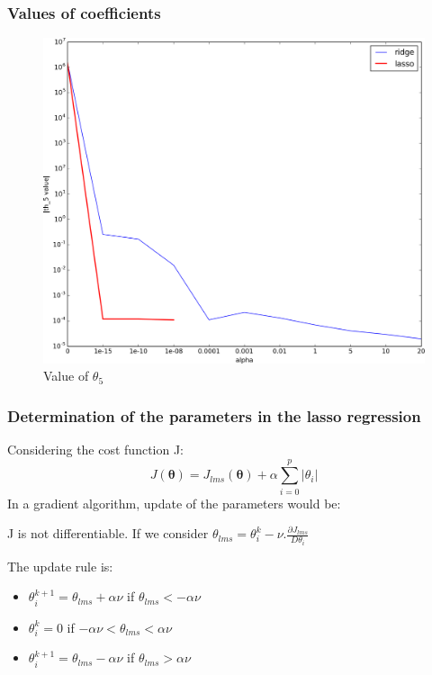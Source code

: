\documentclass[handout]{beamer}
\begin{document}
\begin{frame}
\frametitle{Values of coefficients}
\vspace{-2em}
\begin{table}
\resizebox{\textwidth}{!}{%
}
\end{table}
\begin{figure}
\includegraphics[height=0.4\textheight]{./fig/L1/coefs_th5_lasso.png}\\
Value of $\theta_5$
\end{figure}
\end{frame}

\begin{frame}
\frametitle{Determination of the parameters in the lasso regression}
Considering the cost function J:
$$
J(\bm{\theta}) =J_{lms}(\bm{\theta}) + \alpha \sum_{i=0}^p |\theta_i|
$$
In a gradient algorithm, update of the parameters would be:

J is not differentiable.
If we consider $\theta_{lms} = \theta_i^k -\nu.\frac{\partial J_{lms}}{D\theta_i} $

The update rule is:
\begin{itemize}
\item $\theta_i^{k+1} = \theta_{lms} + \alpha \nu$  if $\theta_{lms} < -\alpha \nu$
\item $\theta_i^k = 0$ if $-\alpha \nu < \theta_{lms} < \alpha \nu$
\item $\theta_i^{k+1} = \theta_{lms} - \alpha \nu$  if $\theta_{lms} > \alpha \nu$
\end{itemize}
\end{frame}
\end{document}
